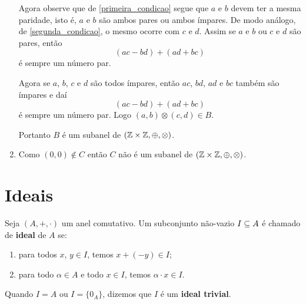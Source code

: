 \begin{exemplo}
\begin{solucao}
\begin{enumerate}[label={\alph*})]
                Agora observe que de \eqref{primeira_condicao} segue que $a$ e $b$ devem ter a mesma paridade, isto é, $a$ e $b$ são
                ambos pares ou ambos ímpares. De modo análogo, de \eqref{segunda_condicao}, o mesmo ocorre com $c$ e $d$. Assim se $a$ e $b$ ou $c$ e $d$ são pares, então
                \[
                    (ac - bd) + (ad + bc)
                \]
                é sempre um número par.

                Agora se $a$, $b$, $c$ e $d$ são todos ímpares, então $ac$, $bd$, $ad$ e $bc$ também são ímpares e daí
                \[
                    (ac - bd) + (ad + bc)
                \]
                é sempre um número par. Logo $(a, b) \otimes (c, d) \in B$.

                Portanto $B$ é um subanel de $(\mathbb{Z} \times \mathbb{Z}, \oplus, \otimes)$.

            \item Como $(0, 0) \notin C$ então $C$ não é um subanel de $(\mathbb{Z} \times \mathbb{Z}, \oplus, \otimes)$.
        \end{enumerate}
    \end{solucao}
\end{exemplo}

\newpage

\section{Ideais} %
\label{sec:ideais}

\begin{definicao}
    Seja $(A, +, \cdot)$ um anel comutativo. Um subconjunto não-vazio $I \subseteq A$ é chamado de \textbf{ideal} de $A$ se:
    \begin{enumerate}[label={\roman*})]
        \item para todos $x$, $y \in I$, temos $x + (-y) \in I$;
        \item para todo $\alpha \in A$ e todo $x \in I$, temos $\alpha\cdot x \in I$.
    \end{enumerate}
\end{definicao}

\begin{observacao}
    Quando $I = A$ ou $I = \{0_A\}$, dizemos que $I$ é um \textbf{ideal trivial}.
\end{observacao}

